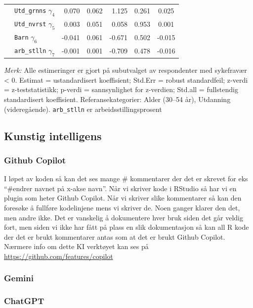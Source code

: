\documentclass[
  12pt,
  a4paper,
  DIV=11,
  numbers=noendperiod]{scrartcl}
\begin{document}
\begin{table}[htbp]
\begin{tabular}{@{}llrrrrc@{}}
& \texttt{Utd\_grnns} $\gamma_4$        & 0.070 & 0.062 & 1.125  & 0.261   & 0.025 \\
& \texttt{Utd\_nvrst} $\gamma_5$        & 0.003 & 0.051 & 0.058  & 0.953   & 0.001 \\
& \texttt{Barn} $\gamma_6$              & -0.041& 0.061 & -0.671 & 0.502   & -0.015 \\
& \texttt{arb\_stlln} $\gamma_7$        & -0.001& 0.001 & -0.709 & 0.478   & -0.016 \\
\bottomrule
\end{tabular}
\raggedright
\footnotesize{%
\textit{Merk:} Alle estimeringer er gjort på subutvalget av respondenter med sykefravær < 0. Estimat = ustandardisert koeffisient; Std.Err = robust standardfeil; z-verdi = z-teststatistikk; p-verdi = sannsynlighet for z-verdien; Std.all = fullstendig standardisert koeffisient. Referansekategorier: Alder (30–54 år), Utdanning (videregående). \texttt{arb\_stlln} er arbeidsstillingsprosent}
\end{table}

\subsection*{Kunstig intelligens}\label{kunstig-intelligens}

\subsubsection*{Github Copilot}\label{github-copilot}

I løpet av koden så kan det ses mange \# kommentarer der det er skrevet
for eks ``\#endrer navnet på x-akse navn''. Når vi skriver kode i
RStudio så har vi en plugin som heter Github Copilot. Når vi skriver
slike kommentarer så kan den foresøke å fullføre kodelinjene mens vi
skriver de. Noen ganger klarer den det, men andre ikke. Det er vanskelig
å dokumentere hver bruk siden det går veldig fort, men siden vi ikke har
fått på plass en slik dokumentasjon så kan all R kode der det er brukt
kommentarer antas som at det er brukt Github Copilot. Nærmere info om
dette KI verktøyet kan ses på \url{https://github.com/features/copilot}

\subsubsection*{Gemini}\label{gemini}

\subsubsection*{ChatGPT}\label{chatgpt}
\end{document}
